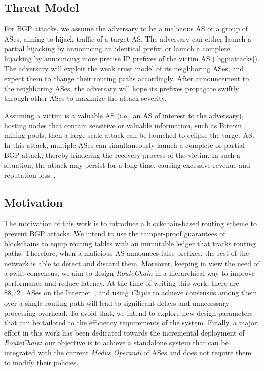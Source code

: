 \documentclass[5p]{elsarticle}
\newcommand{\rc}{{{\em RouteChain}}\xspace}
\begin{document}
\subsection{Threat Model} \label{sec:tm}
For BGP attacks, we assume the adversary to be a malicious AS or a group of ASes, aiming to hijack traffic of a target AS. The adversary can either launch a partial hijacking by announcing an identical prefix, or launch a complete hijacking by announcing more precise IP prefixes of the victim AS (\textsection\ref{bgp:attacks}). The adversary will exploit the weak trust model of its neighboring ASes, and expect them to change their routing paths accordingly. After announcement to the neighboring ASes, the adversary will hope its prefixes propagate swiftly through other ASes to maximize the attack severity. 

Assuming a victim is a valuable AS (i.e., an AS of interest to the adversary), hosting nodes that contain sensitive or valuable information, such as Bitcoin mining pools, then a large-scale attack can be launched to eclipse the target AS. In this attack, multiple ASes can simultaneously launch a complete or partial BGP attack, thereby hindering the recovery process of the victim. In such a situation, the attack may persist for a long time, causing excessive revenue and reputation loss~\cite{BangeraG11}.



\subsection{Motivation}\label{sec:motivation}
The motivation of this work is to introduce a blockchain-based routing scheme to prevent BGP attacks. We intend to use the tamper-proof guarantees of blockchains to equip routing tables with an immutable ledger that tracks routing paths. Therefore, when a malicious AS announces false prefixes, the rest of the network is able to detect and discard them. Moreover, keeping in view the need of a swift consensus, we aim to design \rc in a hierarchical way to improve performance and reduce latency. At the time of writing this work, there are 88,721 ASes on the Internet~\cite{RIR-18}, and using {\em Clique} to achieve consensus among them over a single routing path will lead to significant delays and unnecessary processing overhead. To avoid that, we intend to explore new design parameters that can be tailored to the efficiency requirements of the system.  Finally, a major effort in this work has been dedicated towards the incremental deployment of \rc: our objective is to achieve a standalone system that can be integrated with the current {\em Modus Operandi} of ASes and does not require them to modify their policies. 
\end{document}
